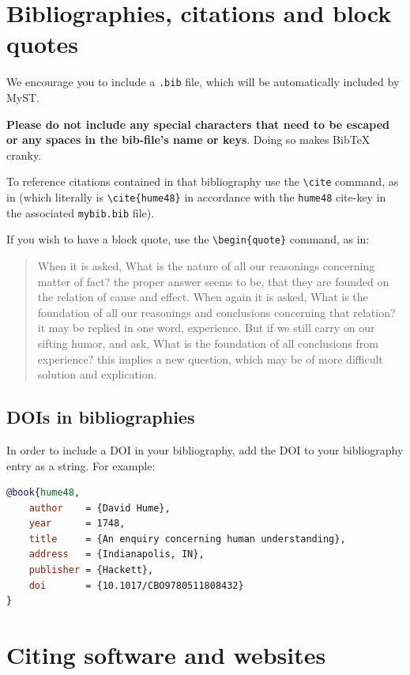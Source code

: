 \section{Bibliographies, citations and block quotes}\label{bibliographies-citations-and-block-quotes}

We encourage you to include a \texttt{.bib} file, which will be automatically included by MyST.

\textbf{Please do not include any special characters that need to be escaped or any spaces in the bib-file's name or keys}. Doing so makes BibTeX cranky.

To reference citations contained in that bibliography use the \verb|\cite| command, as in \citep{hume48} (which literally is \verb|\cite{hume48}| in accordance with the \texttt{hume48} cite-key in the associated \texttt{mybib.bib} file).

If you wish to have a block quote, use the \verb|\begin{quote}| command, as in:

\begin{quote}
    When it is asked, What is the nature of all our reasonings concerning matter of fact? the proper answer seems to be, that they are founded on the relation of cause and effect. When again it is asked, What is the foundation of all our reasonings and conclusions concerning that relation? it may be replied in one word, experience. But if we still carry on our sifting humor, and ask, What is the foundation of all conclusions from experience? this implies a new question, which may be of more difficult solution and explication. \cite{hume48}
\end{quote}

\subsection{DOIs in bibliographies}\label{dois-in-bibliographies}

In order to include a DOI in your bibliography, add the DOI to your bibliography
entry as a string. For example:

\begin{lstlisting}[language=bibtex]
@book{hume48,
    author    = {David Hume},
    year      = 1748,
    title     = {An enquiry concerning human understanding},
    address   = {Indianapolis, IN},
    publisher = {Hackett},
    doi       = {10.1017/CBO9780511808432}
}
\end{lstlisting}


\section{Citing software and websites}\label{citing-software-and-websites}

